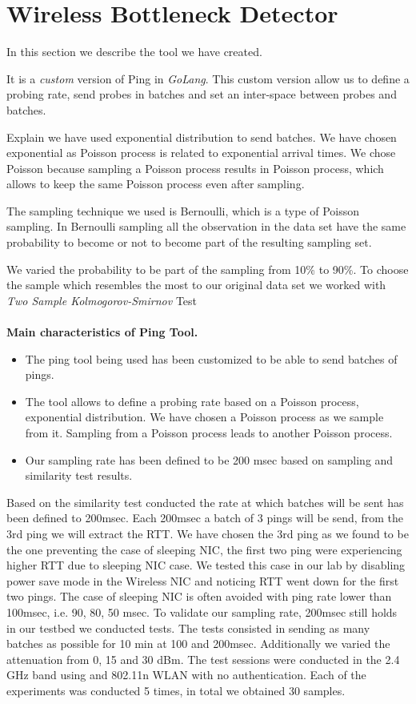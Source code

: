 \section{Wireless Bottleneck Detector}\label{Wireless Bottleneck Detector}

In this section we describe the tool we have created.

It is a \emph{custom} version of Ping in \emph{GoLang}. This custom version allow us to define a probing rate, send probes in batches and set an inter-space between probes and batches.

Explain we have used exponential distribution to send batches. We have chosen exponential as Poisson process is related to exponential arrival times. We chose Poisson because sampling a Poisson process results in Poisson process, which allows to keep the same Poisson process even after sampling.

The sampling technique we used is Bernoulli, which is a type of Poisson sampling. In Bernoulli sampling all the observation in the data set have the same probability to become or not to become part of the resulting sampling set.

We varied the probability to be part of the sampling from 10\% to 90\%. To choose the sample which resembles the most to our original data set we worked with \emph{Two Sample Kolmogorov-Smirnov} Test
\\
\\
\textbf{Main characteristics of Ping Tool.}
\begin{itemize}
	\item The ping tool being used has been customized to be able to send batches of pings.
	\item The tool allows to define a probing rate based on a Poisson process, exponential distribution. We have chosen a Poisson process as we sample from it. Sampling from a Poisson process leads to another Poisson process.
	\item Our sampling rate has been defined to be 200 msec based on sampling and similarity test results.
\end{itemize}

Based on the similarity test conducted the rate at which batches will be sent has been defined to 200msec. Each 200msec a batch of 3 pings will be send, from the 3rd ping we will extract the RTT. We have chosen the 3rd ping as we found to be the one preventing the case of sleeping NIC, the first two ping were experiencing higher RTT due to sleeping NIC case. We tested this case in our lab by disabling power save mode in the Wireless NIC and noticing RTT went down for the first two pings. The case of sleeping NIC is often avoided with ping rate lower than 100msec, i.e. 90, 80, 50 msec. To validate our sampling rate, 200msec still holds in our testbed we conducted tests. The tests consisted in sending as many batches as possible for 10 min at 100 and 200msec. Additionally we varied the attenuation from 0, 15 and 30 dBm. The test sessions were conducted in the 2.4 GHz band using and 802.11n WLAN with no authentication. Each of the experiments was conducted 5 times, in total we obtained 30 samples.

